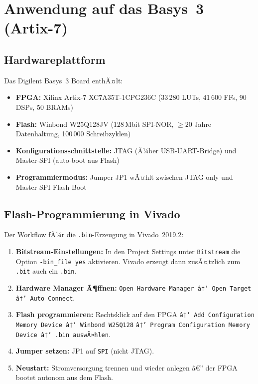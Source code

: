 ﻿\documentclass[a4paper,12pt]{article}
\theoremstyle{definition}
\begin{document}
\section{Anwendung auf das Basys~3 (Artix-7)}
\label{sec:basys3}

\subsection{Hardwareplattform}

Das Digilent Basys~3 Board enthÃ¤lt:
\begin{itemize}
    \item \textbf{FPGA:} Xilinx Artix-7 XC7A35T-1CPG236C
          (33\,280 LUTs, 41\,600 FFs, 90 DSPs, 50 BRAMs)
    \item \textbf{Flash:} Winbond W25Q128JV (128\,Mbit SPI-NOR,
          $\geq 20$ Jahre Datenhaltung, 100\,000 Schreibzyklen)
    \item \textbf{Konfigurationsschnittstelle:} JTAG (Ã¼ber USB-UART-Bridge)
          und Master-SPI (auto-boot aus Flash)
    \item \textbf{Programmiermodus:} Jumper JP1 wÃ¤hlt zwischen
          JTAG-only und Master-SPI-Flash-Boot
\end{itemize}

\subsection{Flash-Programmierung in Vivado}

Der Workflow fÃ¼r die \texttt{.bin}-Erzeugung in Vivado~2019.2:

\begin{enumerate}
    \item \textbf{Bitstream-Einstellungen:} In den Project Settings unter
          \texttt{Bitstream} die Option \texttt{-bin\_file yes} aktivieren.
          Vivado erzeugt dann zusÃ¤tzlich zum \texttt{.bit} auch ein \texttt{.bin}.
    \item \textbf{Hardware Manager Ã¶ffnen:} \texttt{Open Hardware Manager
          â†’ Open Target â†’ Auto Connect}.
    \item \textbf{Flash programmieren:} Rechtsklick auf den FPGA
          \texttt{â†’ Add Configuration Memory Device â†’ Winbond W25Q128}
          \texttt{â†’ Program Configuration Memory Device â†’ .bin auswÃ¤hlen}.
    \item \textbf{Jumper setzen:} JP1 auf \texttt{SPI} (nicht JTAG).
    \item \textbf{Neustart:} Stromversorgung trennen und wieder anlegen â€”
          der FPGA bootet autonom aus dem Flash.
\end{enumerate}
\end{document}
